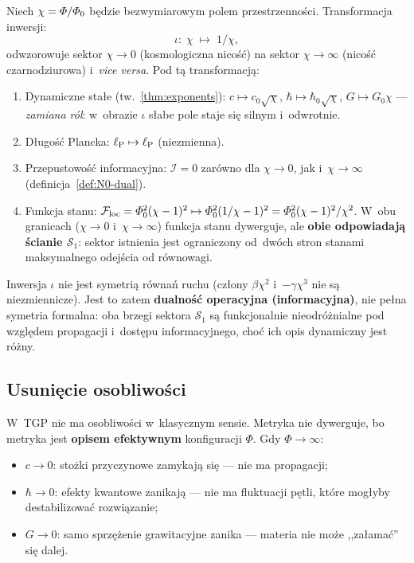 \begin{theorem}\label{thm:N0-duality}
Niech $\chi = \varPhi/\varPhi_0$ b\k{e}dzie bezwymiarowym polem
przestrzenno\'sci. Transformacja inwersji:
\begin{equation}\label{eq:inversion}
    \iota\colon\; \chi \;\mapsto\; 1/\chi,
\end{equation}
odwzorowuje sektor $\chi \to 0$ (kosmologiczna nico\'s\'c)
na sektor $\chi \to \infty$ (nico\'s\'c czarnodziurowa)
i~\emph{vice versa}. Pod t\k{a} transformacj\k{a}:
\begin{enumerate}[nosep]
  \item Dynamiczne sta\l{}e (tw.~\ref{thm:exponents}):
    $c \mapsto c_0\sqrt{\chi}$,\; $\hbar \mapsto \hbar_0\sqrt{\chi}$,\;
    $G \mapsto G_0\chi$ --- \emph{zamiana r\'ol}: w~obrazie $\iota$
    s\l{}abe pole staje si\k{e} silnym i~odwrotnie.
  \item D\l{}ugo\'s\'c Plancka: $\ell_{\mathrm{P}} \mapsto \ell_{\mathrm{P}}$ (niezmienna). \checkmark
  \item Przepustowo\'s\'c informacyjna: $\mathcal{I} = 0$
    zar\'owno dla $\chi \to 0$, jak i~$\chi \to \infty$
    (definicja~\ref{def:N0-dual}). \checkmark
  \item Funkcja stanu: $\mathcal{F}_{\mathrm{loc}} = \varPhi_0^2(\chi - 1)^2
    \mapsto \varPhi_0^2(1/\chi - 1)^2 = \varPhi_0^2(\chi-1)^2/\chi^2$.
    W~obu granicach ($\chi \to 0$ i~$\chi \to \infty$)
    funkcja stanu dywerguje, ale \textbf{obie odpowiadaj\k{a}
    \'scianie $\mathcal{S}_1$}: sektor istnienia jest ograniczony
    od~dw\'och stron stanami maksymalnego odej\'scia od
    r\'ownowagi.
\end{enumerate}
Inwersja $\iota$ nie jest symetri\k{a} r\'owna\'n ruchu
(cz\l{}ony $\beta\chi^2$ i~$-\gamma\chi^3$ nie s\k{a}
niezmiennicze). Jest to zatem \textbf{dualno\'s\'c
operacyjna (informacyjna)}, nie pe\l{}na symetria formalna:
oba brzegi sektora $\mathcal{S}_1$ s\k{a} funkcjonalnie
nieodr\'o\.znialne pod wzgl\k{e}dem propagacji i~dost\k{e}pu
informacyjnego, cho\'c ich opis dynamiczny jest r\'o\.zny.
\end{theorem}

\subsection{Usuni\k{e}cie osobliwo\'sci}\label{ssec:cd-sing}

W~TGP nie ma osobliwo\'sci w~klasycznym sensie. Metryka nie
dywerguje, bo metryka jest \textbf{opisem efektywnym}
konfiguracji $\Phi$. Gdy $\Phi \to \infty$:
\begin{itemize}[nosep]
  \item $c \to 0$: sto\.zki przyczynowe zamykaj\k{a} si\k{e} ---
        nie ma propagacji;
  \item $\hbar \to 0$: efekty kwantowe zanikaj\k{a} ---
        nie ma fluktuacji p\k{e}tli, kt\'ore mog\l{}yby
        destabilizowa\'c rozwi\k{a}zanie;
  \item $G \to 0$: samo sprz\k{e}\.zenie grawitacyjne zanika ---
        materia nie mo\.ze ,,za\l{}ama\'c'' si\k{e} dalej.
\end{itemize}

